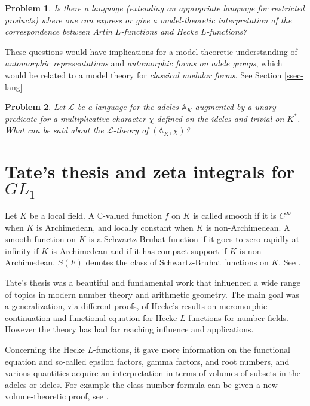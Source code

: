 \documentclass[12pt]{amsart}
\def\A{\mathbb{A}}
\def\R{\mathbb{R}}
\def\C{\mathbb{C}}
\def\cL{\mathcal{L}}
\def\C{\mathbb{C}}
\def\R{\mathbb{R}}
\def\cL{\mathcal{L}}
\numberwithin{equation}{section}
\newtheorem{prob}{Problem}[section]
\begin{document}
\begin{prob} Is there a language (extending an appropriate language for restricted products) where one can express or give a model-theoretic interpretation of the {\it correspondence between Artin $L$-functions and Hecke $L$-functions}? \end{prob}

These questions would have implications for a model-theoretic understanding of {\it automorphic representations} and {\it automorphic forms on adele groups}, which would be related to a model theory for {\it classical modular forms}. See Section \ref{ssec-lang}


\begin{prob}\label{prob-idele-char} Let $\cL$ be a language for the adeles $\A_K$ augmented by a unary predicate for a multiplicative character $\chi$ defined on the ideles and trivial on $K^*$. 
What can be said about the $\cL$-theory of $(\A_K,\chi)$?\end{prob}

\section{\bf Tate's thesis and zeta integrals for $GL_1$}\label{ssec-tate}
Let $K$ be a local field. A $\C$-valued function $f$ on $K$ is called smooth if it is $C^{\infty}$ when $K$ is 
Archimedean, and locally constant when $K$ is non-Archimedean. A smooth function on $K$ is a Schwartz-Bruhat function if it goes to zero rapidly at infinity if $K$ is Archimedean and if it has compact support if $K$ is non-Archimedean.  $S(F)$ denotes the class of Schwartz-Bruhat functions on $K$. See \cite{ramak}.

Tate's thesis \cite{tate-thesis} was a beautiful and fundamental work that influenced a wide range of topics in modern number theory and arithmetic geometry. The main goal was a generalization, via different proofs, of 
Hecke's results on meromorphic continuation and functional equation for Hecke $L$-functions for number fields. However the theory has had far reaching influence and applications. 

Concerning the Hecke $L$-functions, it gave more information on the 
functional equation and so-called epsilon factors, gamma factors, and root numbers, and various quantities acquire an interpretation in terms of volumes of subsets in the adeles or ideles. 
For example the class number formula can be given a new volume-theoretic proof, see \cite{ramak}. 
\end{document}
